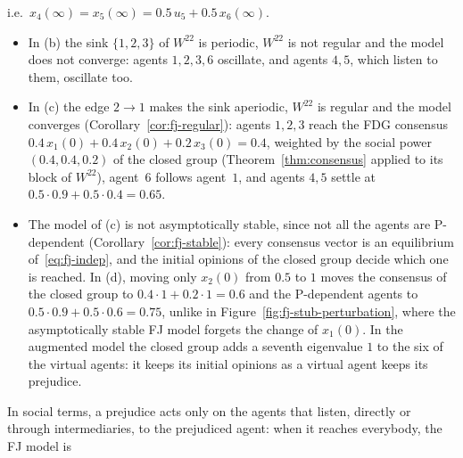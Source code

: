 i.e.\ $x_4(\infty) = x_5(\infty) = 0.5\, u_5 + 0.5\, x_6(\infty)$.
\begin{itemize}
  \item In (b) the sink $\{1,2,3\}$ of $W^{22}$ is periodic, $W^{22}$ is not regular
        and the model does not converge: agents $1, 2, 3, 6$ oscillate, and agents
        $4, 5$, which listen to them, oscillate too.
  \item In (c) the edge $2 \to 1$ makes the sink aperiodic, $W^{22}$ is regular and the
        model converges (Corollary~\ref{cor:fj-regular}): agents $1, 2, 3$ reach the
        FDG consensus $0.4\, x_1(0) + 0.4\, x_2(0) + 0.2\, x_3(0) = 0.4$, weighted by the
        social power $(0.4, 0.4, 0.2)$ of the closed group (Theorem~\ref{thm:consensus}
        applied to its block of $W^{22}$), agent~$6$ follows agent~$1$, and agents $4, 5$
        settle at $0.5 \cdot 0.9 + 0.5 \cdot 0.4 = 0.65$.
  \item The model of (c) is not asymptotically stable, since not all the agents are
        P-dependent (Corollary~\ref{cor:fj-stable}): every consensus vector is an
        equilibrium of~\eqref{eq:fj-indep}, and the initial opinions of the closed group
        decide which one is reached. In (d), moving only $x_2(0)$ from $0.5$ to $1$
        moves the consensus of the closed group to $0.4 \cdot 1 + 0.2 \cdot 1 = 0.6$ and the
        P-dependent agents to $0.5 \cdot 0.9 + 0.5 \cdot 0.6 = 0.75$, unlike in
        Figure~\ref{fig:fj-stub-perturbation}, where the
        asymptotically stable FJ model forgets the change of $x_1(0)$. In the augmented
        model the closed group adds a seventh eigenvalue $1$ to the six of the virtual
        agents: it keeps its initial opinions as a virtual agent
        keeps its prejudice.
\end{itemize}
In social terms, a prejudice acts only on the agents that listen, directly or through
intermediaries, to the prejudiced agent: when it reaches everybody, the FJ model is
